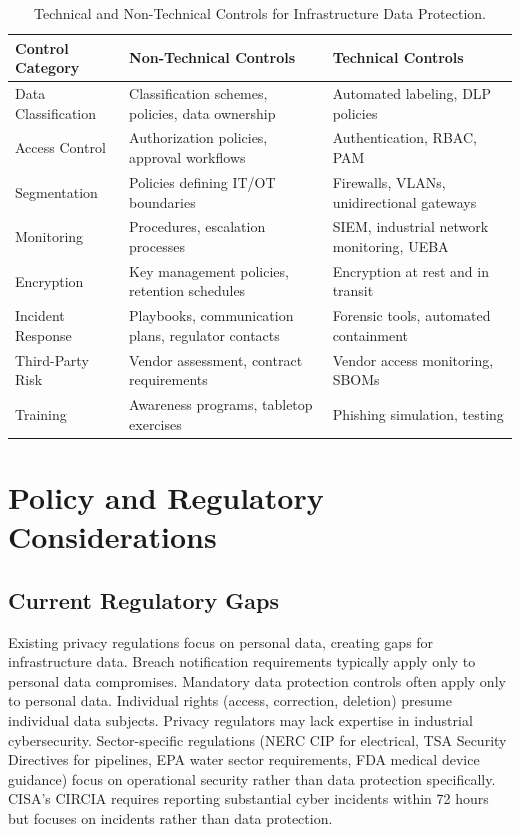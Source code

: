 \documentclass[sigconf,nonacm]{acmart}
\begin{document}
\begin{table}[t]
\caption{Technical and Non-Technical Controls for Infrastructure Data Protection.}
\label{tab:controls}
\small
\setlength{\tabcolsep}{5pt}
\begin{tabularx}{\textwidth}{@{}p{3.0cm}XX@{}}
\toprule
\textbf{Control Category} & \textbf{Non-Technical Controls} & \textbf{Technical Controls} \\
\midrule
Data Classification  & Classification schemes, policies, data ownership & Automated labeling, DLP policies \\
\addlinespace[3pt]
Access Control       & Authorization policies, approval workflows        & Authentication, RBAC, PAM \\
\addlinespace[3pt]
Segmentation         & Policies defining IT/OT boundaries                & Firewalls, VLANs, unidirectional gateways \\
\addlinespace[3pt]
Monitoring           & Procedures, escalation processes                  & SIEM, industrial network monitoring, UEBA \\
\addlinespace[3pt]
Encryption           & Key management policies, retention schedules      & Encryption at rest and in transit \\
\addlinespace[3pt]
Incident Response    & Playbooks, communication plans, regulator contacts & Forensic tools, automated containment \\
\addlinespace[3pt]
Third-Party Risk     & Vendor assessment, contract requirements          & Vendor access monitoring, SBOMs \\
\addlinespace[3pt]
Training             & Awareness programs, tabletop exercises            & Phishing simulation, testing \\
\bottomrule
\end{tabularx}
\end{table}

\section{Policy and Regulatory Considerations}

\subsection{Current Regulatory Gaps}

Existing privacy regulations focus on personal data, creating gaps for infrastructure
data. Breach notification requirements typically apply only to personal data compromises.
Mandatory data protection controls often apply only to personal data. Individual rights
(access, correction, deletion) presume individual data subjects. Privacy regulators may
lack expertise in industrial cybersecurity. Sector-specific regulations (NERC CIP for
electrical, TSA Security Directives for pipelines, EPA water sector requirements, FDA
medical device guidance) focus on operational security rather than data protection
specifically. CISA's CIRCIA requires reporting substantial cyber incidents within 72
hours but focuses on incidents rather than data protection.
\end{document}
